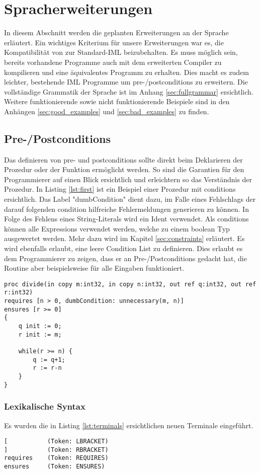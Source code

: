 \section{Spracherweiterungen}
In diesem Abschnitt werden die geplanten Erweiterungen an der Sprache erläutert. 
Ein wichtiges Kriterium für unsere Erweiterungen war es, die Kompatibilität von 
zur Standard-IML beizubehalten. Es muss möglich sein, bereits vorhandene Programme
auch mit dem erweiterten Compiler zu kompilieren und eine äquivalentes Programm zu 
erhalten. Dies macht es zudem leichter, bestehende IML Programme um pre-/postconditions
zu erweitern.
Die vollständige Grammatik der Sprache ist im Anhang \ref{sec:fullgrammar} 
ersichtlich. Weitere funktionierende sowie nicht funktionierende Beispiele sind in den Anhängen
\ref{sec:good_examples} und \ref{sec:bad_examples} zu finden.

\subsection{Pre-/Postconditions}
Das definieren von pre- und postconditions sollte direkt beim Deklarieren
der Prozedur oder der Funktion ermöglicht werden. So sind die Garantien
für den Programmierer auf einen Blick ersichtlich und erleichtern so 
das Verständnis der Prozedur. In Listing \ref{lst:first} ist ein Beispiel 
einer Prozedur mit conditions ersichtlich. Das Label "dumbCondition" dient dazu, im
Falle eines Fehlschlags der darauf folgenden condition hilfreiche Fehlermeldungen generieren zu können.
In Folge des Fehlens eines String-Literals wird ein Ident verwendet.
Als conditions können alle Expressions verwendet
werden, welche zu einem boolean Typ ausgewertet werden. Mehr dazu wird im 
Kapitel \ref{sec:constraints} erläutert.
Es wird ebenfalls erlaubt, eine leere Condition List zu definieren. Dies erlaubt es dem Programmierer
zu zeigen, dass er an Pre-/Postconditions gedacht hat, die Routine aber beispielsweise für alle
Eingaben funktioniert.
\newline
\begin{lstlisting}[caption=Beispiele von pre-/postconditions,label={lst:first}]
proc divide(in copy m:int32, in copy n:int32, out ref q:int32, out ref r:int32)
requires [n > 0, dumbCondition: unnecessary(m, n)]
ensures [r >= 0]
{
    q init := 0;
    r init := m;

    while(r >= n) {
        q := q+1;
        r := r-n
    }
}
\end{lstlisting}

\subsubsection{Lexikalische Syntax}
Es wurden die in Listing \ref{lst:terminals} ersichtlichen neuen Terminale eingeführt.
\begin{lstlisting}[caption=Liste neuer Terminalsymbole,label=lst:terminals]
[           (Token: LBRACKET)
]           (Token: RBRACKET)
requires    (Token: REQUIRES)
ensures     (Token: ENSURES)
\end{lstlisting}

